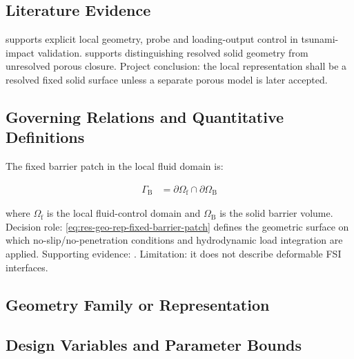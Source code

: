 
\subsection{Literature Evidence}
\label{sec:res-geo-rep-literature-evidence}

\textcite{watanabe2022validation} supports explicit local geometry,
probe and loading-output control in tsunami-impact validation.
\textcite{deljesus2012porous} supports distinguishing resolved solid
geometry from unresolved porous closure. Project conclusion: the
local representation shall be a resolved fixed solid surface unless a
separate porous model is later accepted.

\subsection{Governing Relations and Quantitative Definitions}
\label{sec:res-geo-rep-governing-relations}

The fixed barrier patch in the local fluid domain is:

\begin{align}
  \Gamma_{\mathrm{B}}
  &=
  \partial\Omega_{\mathrm{f}}
  \cap
  \partial\Omega_{\mathrm{B}}
  \label{eq:res-geo-rep-fixed-barrier-patch}
\end{align}

where $\Omega_{\mathrm{f}}$ is the local fluid-control domain and
$\Omega_{\mathrm{B}}$ is the solid barrier volume. Decision role:
\cref{eq:res-geo-rep-fixed-barrier-patch} defines the geometric
surface on which no-slip/no-penetration conditions and hydrodynamic
load integration are applied. Supporting evidence:
\textcite{watanabe2022validation}. Limitation: it does not describe
deformable FSI interfaces.

\subsection{Geometry Family or Representation}
\label{sec:res-geo-rep-geometry-family-representation}


\subsection{Design Variables and Parameter Bounds}
\label{sec:res-geo-rep-design-variables-parameter-bounds}


